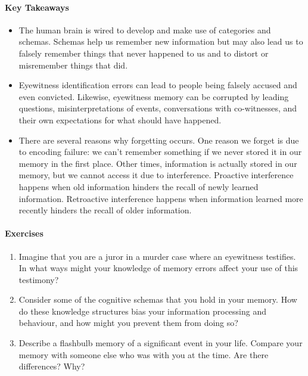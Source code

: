\documentclass[
]{krantz}
\providecommand{\tightlist}{%
  \setlength{\itemsep}{0pt}\setlength{\parskip}{0pt}}
\begin{document}
\hypertarget{key-takeaways-5}{%
\paragraph*{Key Takeaways}\label{key-takeaways-5}}

\begin{itemize}
\tightlist
\item
  The human brain is wired to develop and make use of categories and schemas. Schemas help us remember new information but may also lead us to falsely remember things that never happened to us and to distort or misremember things that did.
\item
  Eyewitness identification errors can lead to people being falsely accused and even convicted. Likewise, eyewitness memory can be corrupted by leading questions, misinterpretations of events, conversations with co-witnesses, and their own expectations for what should have happened.
\item
  There are several reasons why forgetting occurs. One reason we forget is due to encoding failure: we can't remember something if we never stored it in our memory in the first place. Other times, information is actually stored in our memory, but we cannot access it due to interference. Proactive interference happens when old information hinders the recall of newly learned information. Retroactive interference happens when information learned more recently hinders the recall of older information.
\end{itemize}

\hypertarget{exercises-5}{%
\paragraph*{Exercises}\label{exercises-5}}

\begin{enumerate}
\def\labelenumi{\arabic{enumi}.}
\tightlist
\item
  Imagine that you are a juror in a murder case where an eyewitness testifies. In what ways might your knowledge of memory errors affect your use of this testimony?
\item
  Consider some of the cognitive schemas that you hold in your memory. How do these knowledge structures bias your information processing and behaviour, and how might you prevent them from doing so?
\item
  Describe a flashbulb memory of a significant event in your life. Compare your memory with someone else who was with you at the time. Are there differences? Why?
\end{enumerate}
\end{document}
